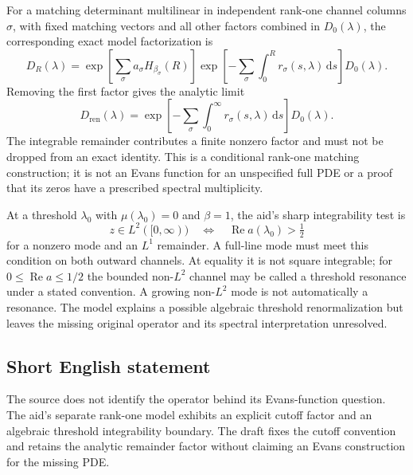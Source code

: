 \documentclass[11pt]{article}
\begin{document}
For a matching determinant multilinear in independent rank-one channel columns \(\sigma\), with fixed matching vectors and all other factors combined in \(D_0(\lambda)\), the corresponding exact model factorization is
\[
 D_R(\lambda)=
 \exp\left[\sum_\sigma a_\sigma H_{\beta_\sigma}(R)\right]
 \exp\left[-\sum_\sigma\int_0^Rr_\sigma(s,\lambda)\,\mathrm ds\right]D_0(\lambda).
\]
Removing the first factor gives the analytic limit
\[
 D_{\mathrm{ren}}(\lambda)=
 \exp\left[-\sum_\sigma\int_0^\infty r_\sigma(s,\lambda)\,\mathrm ds\right]
 D_0(\lambda).
\]
The integrable remainder contributes a finite nonzero factor and must not be dropped from an exact identity. This is a conditional rank-one matching construction; it is not an Evans function for an unspecified full PDE or a proof that its zeros have a prescribed spectral multiplicity.

At a threshold \(\lambda_0\) with \(\mu(\lambda_0)=0\) and \(\beta=1\), the aid's sharp integrability test is
\[
 z\in L^2([0,\infty))\quad\Longleftrightarrow\quad
 \operatorname{Re}a(\lambda_0)>\tfrac12
\]
for a nonzero mode and an \(L^1\) remainder. A full-line mode must meet this condition on both outward channels. At equality it is not square integrable; for \(0\leq\operatorname{Re}a\leq1/2\) the bounded non-\(L^2\) channel may be called a threshold resonance under a stated convention. A growing non-\(L^2\) mode is not automatically a resonance. The model explains a possible algebraic threshold renormalization but leaves the missing original operator and its spectral interpretation unresolved.
\subsection{Short English statement}
The source does not identify the operator behind its Evans-function question. The aid's separate rank-one model exhibits an explicit cutoff factor and an algebraic threshold integrability boundary. The draft fixes the cutoff convention and retains the analytic remainder factor without claiming an Evans construction for the missing PDE.
\end{document}

